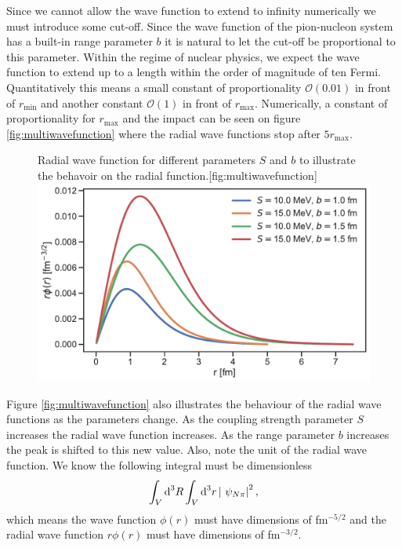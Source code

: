 Since we cannot allow the wave function to extend to infinity numerically we must introduce some cut-off. Since the wave function of the pion-nucleon system has a built-in range parameter $b$ it is natural to let the cut-off be proportional to this parameter.
Within the regime of nuclear physics, we expect the wave function to extend up to a length within the order of magnitude of ten Fermi. Quantitatively this means a small constant of proportionality $\mathcal{O}(0.01)$ in front of $r_\text{min}$ and another constant $\mathcal{O}(1)$ in front of $r_{\text{max}}$. Numerically, a constant of proportionality for $r_{\text{max}}$ and the impact can be seen on figure \ref{fig:multiwavefunction} where the radial wave functions stop after $5r_\text{max}$.
\begin{figure}[H]
	\begin{sidecaption}{Radial wave function for different parameters $S$ and $b$ to illustrate the behavoir on the radial function.}[fig:multiwavefunction]
		\includegraphics[width=\linewidth]{Figures/multiwavefunction.pdf}
	\end{sidecaption}
\end{figure} 
Figure \ref{fig:multiwavefunction} also illustrates the behaviour of the radial wave functions as the parameters change. As the coupling strength parameter $S$ increases the radial wave function increases. As the range parameter $b$ increases the peak is shifted to this new value. Also, note the unit of the radial wave function. We know the following integral must be dimensionless 
\begin{equation} \label{key}
	\int_V \text{d}^3R \int_V \text{d}^3r \, \abs{ \psi_{N\pi}}^2,
\end{equation}
which means the wave function $\phi(r)$ must have dimensions of fm$^{-5/2}$ and the radial wave function $r\phi(r)$ must have dimensions of fm$^{-3/2}$.

